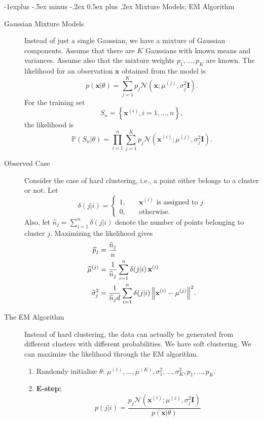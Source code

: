 \documentclass[10pt,landscape,a4paper]{article}
\makeatletter
\renewcommand{\subsection}{\@startsection{subsection}{2}{0mm}%
                                {-1explus -.5ex minus -.2ex}%
                                {0.5ex plus .2ex}%
                                {\normalfont\normalsize\bfseries}}
\makeatother
\begin{document}
\begin{multicols*}{3}
\subsection{Mixture Models; EM Algorithm}
\begin{description}
	\item[Gaussian Mixture Models] Instead of just a single Gaussian, we have a mixture of Gaussian components. Assume that there are $K$ Gaussians with known means and variances. Assume also that the mixture weights $p_1,\dots,p_K$ are known. The likelihood for an observation $\mathbf{x}$ obtained from the model is
	$$p(\mathbf{x}|\theta)=\sum_{j=1}^{K}p_j\mathcal{N}\left(\mathbf{x};\mu^{(j)},\sigma_j^2\mathbf{I}\right).$$
	For the training set
	$$S_n=\left\{\mathbf{x}^{(i)}, i=1,\dots,n\right\},$$
	the likelihood is
	$$\mathbb{P}\left(S_n|\theta\right)=\prod_{i=1}^{n}\sum_{j=1}^{K}p_j\mathcal{N}\left(\mathbf{x}^{(i)};\mu^{(j)},\sigma_j^2\mathbf{I}\right).$$
	\item[Observed Case] Consider the case of hard clustering, i.e., a point either belongs to a cluster or not. Let
	$$\delta(j|i)=
	\begin{cases}
		1,\quad&\mathbf{x}^{(i)}\text{ is assigned to }j\\
		0,&\text{otherwise}.
	\end{cases}$$
	Also, let $\widehat{n}_j=\sum\limits_{i=1}^{n}\delta(j|i)$ denote the number of points belonging to cluster $j$. Maximizing the likelihood gives
	\begin{align*}
		\widehat{p}_j&=\dfrac{\widehat{n}_j}{n}\\
		\widehat{\mu}^{(j)}&=\dfrac{1}{\widehat{n}_j}\sum_{i=1}^{n}\delta(j|i)\,\mathbf{x}^{(i)}\\
		\widehat{\sigma}^2_j&=\dfrac{1}{\widehat{n}_jd}\sum_{i=1}^{n}\delta(j|i)\,\norm{\mathbf{x}^{(i)}-\mu^{(j)}}^2.
	\end{align*}
	\item[The EM Algorithm] Instead of hard clustering, the data can actually be generated from different clusters with different probabilities. We have soft clustering. We can maximize the likelihood through the EM algorithm.
	\begin{enumerate}
		\item[] Randomly initialize $\theta$: $\mu^{(1)},\dots,\mu^{(K)},\sigma^2_1,\dots,\sigma^2_K,p_1,\dots,p_K.$
		\item {\bf E-step:}
		$$p(j|i)=\dfrac{p_j\mathcal{N}\left(\mathbf{x}^{(i)};\mu^{(j)},\sigma^2_j\mathbf{I}\right)}{p\left(\mathbf{x}|\theta\right)}$$

\end{enumerate}
\end{description}
\end{multicols*}
\end{document}
